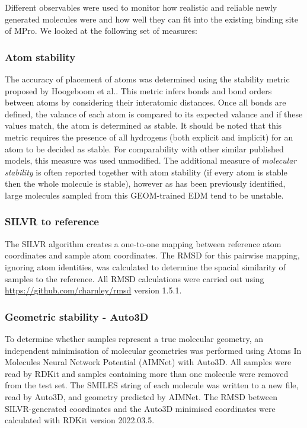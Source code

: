 \documentclass[journal=jacsat,manuscript=article]{achemso}
\begin{document}
Different observables were used to monitor how realistic and reliable newly generated molecules were and how well they can fit into the existing binding site of MPro. We looked at the following set of measures:

\subsubsection{Atom stability}
The accuracy of placement of atoms was determined using the stability metric proposed by Hoogeboom et al.. This metric infers bonds and bond orders between atoms by considering their interatomic distances. Once all bonds are defined, the valance of each atom is compared to its expected valance and if these values match, the atom is determined as stable. It should be noted that this metric requires the presence of all hydrogens (both explicit and implicit) for an atom to be decided as stable. For comparability with other similar published models, this measure was used unmodified. The additional measure of \textit{molecular stability} is often reported together with atom stability (if every atom is stable then the whole molecule is stable), however as has been previously identified, large molecules sampled from this GEOM-trained EDM tend to be unstable.

\subsubsection{SILVR to reference}
The SILVR algorithm creates a one-to-one mapping between reference atom coordinates and sample atom coordinates. The RMSD for this pairwise mapping, ignoring atom identities, was calculated to determine the spacial similarity of samples to the reference. All RMSD calculations were carried out using \url{https://github.com/charnley/rmsd} version 1.5.1.

\subsubsection{Geometric stability - Auto3D}
To determine whether samples represent a true molecular geometry, an independent minimisation of molecular geometries was performed using Atoms In Molecules Neural Network Potential (AIMNet) with Auto3D. All samples were read by RDKit and samples containing more than one molecule were removed from the test set. The SMILES string of each molecule was written to a new file, read by Auto3D, and geometry predicted by AIMNet. The RMSD between SILVR-generated coordinates and the Auto3D minimised coordinates were calculated with RDKit version 2022.03.5.
\end{document}
